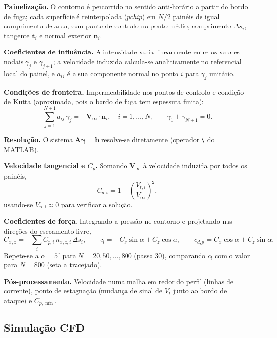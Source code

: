 \begin{etapas}
  \item \textbf{Painelização.} O contorno é percorrido no sentido anti-horário a
  partir do bordo de fuga; cada superfície é reinterpolada (\emph{pchip}) em
  $N/2$ painéis de igual comprimento de arco, com ponto de controlo no ponto
  médio, comprimento $\Delta s_i$, tangente $\mathbf{t}_i$ e normal exterior
  $\mathbf{n}_i$.
  \item \textbf{Coeficientes de influência.} A intensidade varia linearmente
  entre os valores nodais $\gamma_j$ e $\gamma_{j+1}$; a velocidade induzida
  calcula-se analiticamente no referencial local do painel, e $a_{ij}$ é a sua
  componente normal no ponto $i$ para $\gamma_j$ unitário.
  \item \textbf{Condições de fronteira.} Impermeabilidade nos pontos de
  controlo e condição de Kutta (aproximada, pois o bordo de fuga tem espessura
  finita):
  \[
    \sum_{j=1}^{N+1} a_{ij}\,\gamma_j = -\mathbf{V}_\infty \cdot \mathbf{n}_i ,
    \quad i = 1,\dots,N, \qquad \gamma_1 + \gamma_{N+1} = 0 .
  \]
  \item \textbf{Resolução.} O sistema $\mathbf{A}\boldsymbol{\gamma} = \mathbf{b}$
  resolve-se diretamente (operador \texttt{\textbackslash} do MATLAB).
  \item \textbf{Velocidade tangencial e $C_p$.} Somando $\mathbf{V}_\infty$ à
  velocidade induzida por todos os painéis,
  \[
    C_{p,i} = 1 - \left(\frac{V_{t,i}}{V_\infty}\right)^2 ,
  \]
  usando-se $V_{n,i} \approx 0$ para verificar a solução.
  \item \textbf{Coeficientes de força.} Integrando a pressão no contorno e
  projetando nas direções do escoamento livre,
  \[
    C_{x,z} = -\sum_i C_{p,i}\, n_{x,z,i}\,\Delta s_i , \qquad
    c_l = -C_x \sin\alpha + C_z \cos\alpha , \qquad
    c_{d,p} = C_x \cos\alpha + C_z \sin\alpha .
  \]
  Repete-se a $\alpha = 5^\circ$ para $N = 20, 50, \dots, 800$ (passo 30),
  comparando $c_l$ com o valor para $N = 800$ (seta a tracejado).
  \item \textbf{Pós-processamento.} Velocidade numa malha em redor do perfil
  (linhas de corrente), ponto de estagnação (mudança de sinal de $V_t$ junto ao
  bordo de ataque) e $C_{p,\min}$.
\end{etapas}


\subsection*{Simulação CFD}

